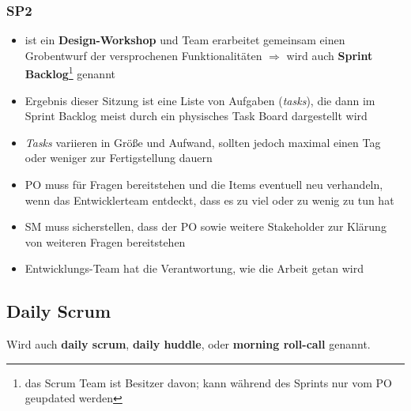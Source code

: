 \subsubsection{SP2}
\begin{itemize}
  \item ist ein \textbf{Design-Workshop} und Team erarbeitet gemeinsam einen Grobentwurf der
    versprochenen Funktionalitäten $\Rightarrow$  wird auch \textbf{Sprint Backlog}\footnote{das
    Scrum Team ist Besitzer davon; kann während des Sprints nur vom PO geupdated werden} genannt
  \item Ergebnis dieser Sitzung ist eine Liste von Aufgaben (\textit{tasks}), die dann im Sprint Backlog meist
    durch ein physisches Task Board dargestellt wird
  \item \textit{Tasks} variieren in Größe und Aufwand, sollten jedoch maximal einen Tag oder weniger zur
    Fertigstellung dauern
  \item PO muss für Fragen bereitstehen und die Items eventuell neu verhandeln, wenn das
    Entwicklerteam entdeckt, dass es zu viel oder zu wenig zu tun hat
  \item SM muss sicherstellen, dass der PO sowie weitere Stakeholder zur Klärung
    von weiteren Fragen bereitstehen
  \item Entwicklungs-Team hat die Verantwortung, wie die Arbeit getan wird
\end{itemize}


\subsection{Daily Scrum}
Wird auch \textbf{daily scrum}, \textbf{daily huddle}, oder \textbf{morning roll-call} genannt.

